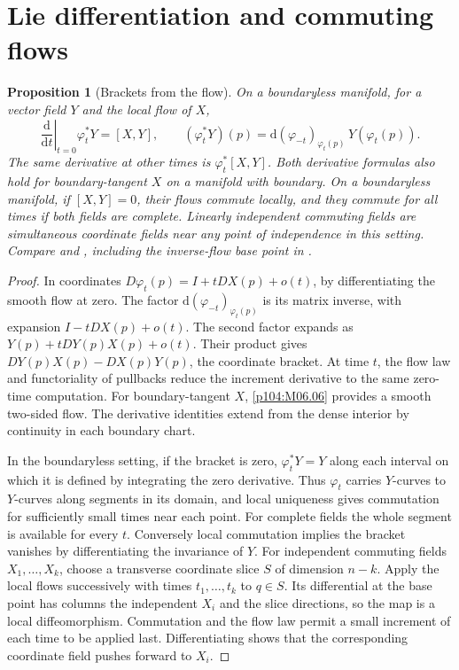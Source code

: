 \documentclass[11pt,oneside,openany]{book}
\newtheorem{proposition}[theorem]{Proposition}
\theoremstyle{definition}
\theoremstyle{remark}
\newcommand{\dd}{\mathrm d}
\begin{document}
\section{Lie differentiation and commuting flows}

\begin{proposition}[Brackets from the flow]\label{p104:M06.07}
On a boundaryless manifold, for a vector field \(Y\) and the local flow of \(X\),
\[
 \left.\frac{\dd}{\dd t}\right|_{t=0}\varphi_t^*Y=[X,Y],
 \qquad (\varphi_t^*Y)(p)=\dd(\varphi_{-t})_{\varphi_t(p)}\,Y(\varphi_t(p)).
\]
The same derivative at other times is \(\varphi_t^*[X,Y]\). Both derivative formulas also hold for boundary-tangent \(X\) on a manifold with boundary. On a boundaryless manifold, if \([X,Y]=0\), their flows commute locally, and they commute for all times if both fields are complete. Linearly independent commuting fields are simultaneous coordinate fields near any point of independence in this setting. Compare \cite[pp.\ 227--236]{lee} and \cite[\S20.2]{tu}, including the inverse-flow base point in \cite{tuerrata}.
\end{proposition}
\begin{proof}
In coordinates \(D\varphi_t(p)=I+tDX(p)+o(t)\), by differentiating the smooth flow at zero. The factor \(\dd(\varphi_{-t})_{\varphi_t(p)}\) is its matrix inverse, with expansion \(I-tDX(p)+o(t)\). The second factor expands as \(Y(p)+tDY(p)X(p)+o(t)\). Their product gives \(DY(p)X(p)-DX(p)Y(p)\), the coordinate bracket. At time \(t\), the flow law and functoriality of pullbacks reduce the increment derivative to the same zero-time computation. For boundary-tangent \(X\), \cref{p104:M06.06} provides a smooth two-sided flow. The derivative identities extend from the dense interior by continuity in each boundary chart.

In the boundaryless setting, if the bracket is zero, \(\varphi_t^*Y=Y\) along each interval on which it is defined by integrating the zero derivative. Thus \(\varphi_t\) carries \(Y\)-curves to \(Y\)-curves along segments in its domain, and local uniqueness gives commutation for sufficiently small times near each point. For complete fields the whole segment is available for every \(t\). Conversely local commutation implies the bracket vanishes by differentiating the invariance of \(Y\). For independent commuting fields \(X_1,\ldots,X_k\), choose a transverse coordinate slice \(S\) of dimension \(n-k\). Apply the local flows successively with times \(t_1,\ldots,t_k\) to \(q\in S\). Its differential at the base point has columns the independent \(X_i\) and the slice directions, so the map is a local diffeomorphism. Commutation and the flow law permit a small increment of each time to be applied last. Differentiating shows that the corresponding coordinate field pushes forward to \(X_i\).
\end{proof}
\end{document}
